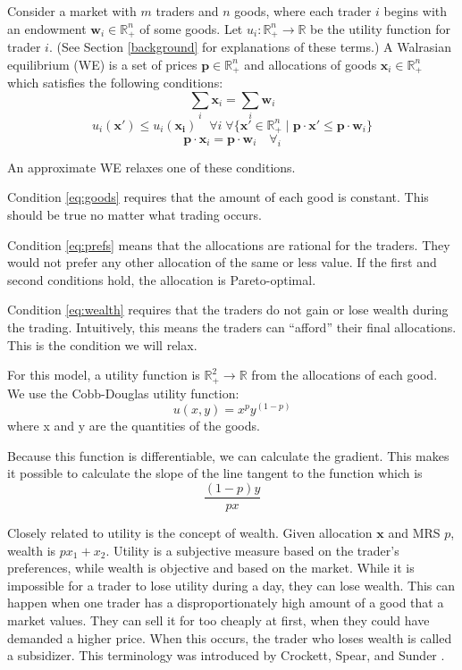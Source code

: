 \documentclass[12pt,a4paper,titlepage]{article}
\begin{document}
Consider a market with $m$ traders and $n$ goods, where each trader $i$ begins with an endowment $\mathbf{w}_i \in \mathbb{R}^n_+ $ of some goods.
Let $u_i : \mathbb{R}^n_+ \rightarrow \mathbb{R}$ be the utility function for trader $i$.
(See Section \ref{background} for explanations of these terms.)
A Walrasian equilibrium (WE) is a set of prices $\mathbf{p} \in \mathbb{R}^n_+$ and allocations of goods $\mathbf{x}_i \in \mathbb{R}^n_+$ which satisfies the following conditions:
\begin{equation}\label{eq:goods}
  \sum_i \mathbf{x}_i = \sum_i \mathbf{w}_i 
\end{equation}
\begin{equation}\label{eq:prefs}
  u_i(\mathbf{x'}) \leq u_i(\mathbf{x_i}) \quad
  \forall{i} \; \forall{\{\mathbf{x'} \in \mathbb{R}^n_+ \mid \mathbf{p} \cdot \mathbf{x'} \leq \mathbf{p} \cdot \mathbf{w}_i}\}
\end{equation}
\begin{equation}\label{eq:wealth}
  \mathbf{p} \cdot \mathbf{x}_i = \mathbf{p} \cdot \mathbf{w}_i \quad \forall_i 
\end{equation}

An approximate WE relaxes one of these conditions.

Condition \ref{eq:goods} requires that the amount of each good is constant.
This should be true no matter what trading occurs.

Condition \ref{eq:prefs} means that the allocations are rational for the traders.
They would not prefer any other allocation of the same or less value.
If the first and second conditions hold, the allocation is Pareto-optimal.

Condition \ref{eq:wealth} requires that the traders do not gain or lose wealth during the trading.
Intuitively, this means the traders can ``afford'' their final allocations.
This is the condition we will relax.

For this model, a utility function is $\mathbb{R}^2_+ \rightarrow \mathbb{R}$ from the allocations of each good.
We use the Cobb-Douglas utility function:
\[
  u(x, y) = x^p y^{(1-p)}
\]
where x and y are the quantities of the goods.

Because this function is differentiable, we can calculate the gradient.
This makes it possible to calculate the slope of the line tangent to the function which is 
\[
  \frac{(1-p)y}{px}
\]

Closely related to utility is the concept of wealth.
Given allocation $\mathbf{x}$ and MRS $p$, wealth is $ px_1 + x_2 $.
Utility is a subjective measure based on the trader's preferences, while wealth is objective and based on the market.
While it is impossible for a trader to lose utility during a day, they can lose wealth.
This can happen when one trader has a disproportionately high amount of a good that a market values.
They can sell it for too cheaply at first, when they could have demanded a higher price.
When this occurs, the trader who loses wealth is called a subsidizer.
This terminology was introduced by Crockett, Spear, and Sunder \cite{crockett}.
\end{document}
